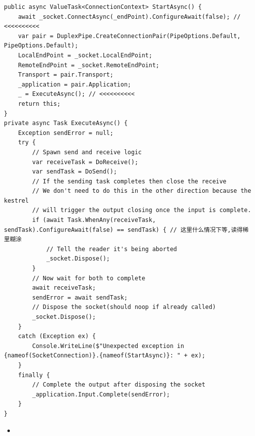 \documentclass[9pt, b5paper]{article}
\begin{document}
\begin{verbatim}
public async ValueTask<ConnectionContext> StartAsync() {
    await _socket.ConnectAsync(_endPoint).ConfigureAwait(false); // <<<<<<<<<<  
    var pair = DuplexPipe.CreateConnectionPair(PipeOptions.Default, PipeOptions.Default);
    LocalEndPoint = _socket.LocalEndPoint;
    RemoteEndPoint = _socket.RemoteEndPoint;
    Transport = pair.Transport;
    _application = pair.Application;
    _ = ExecuteAsync(); // <<<<<<<<<< 
    return this;
}
private async Task ExecuteAsync() {
    Exception sendError = null;
    try {
        // Spawn send and receive logic
        var receiveTask = DoReceive();
        var sendTask = DoSend();
        // If the sending task completes then close the receive
        // We don't need to do this in the other direction because the kestrel
        // will trigger the output closing once the input is complete.
        if (await Task.WhenAny(receiveTask, sendTask).ConfigureAwait(false) == sendTask) { // 这里什么情况下等,读得稀里糊涂
            // Tell the reader it's being aborted
            _socket.Dispose();
        }
        // Now wait for both to complete
        await receiveTask;
        sendError = await sendTask;
        // Dispose the socket(should noop if already called)
        _socket.Dispose();
    }
    catch (Exception ex) {
        Console.WriteLine($"Unexpected exception in {nameof(SocketConnection)}.{nameof(StartAsync)}: " + ex);
    }
    finally {
        // Complete the output after disposing the socket
        _application.Input.Complete(sendError);
    }
}
\end{verbatim}
\begin{itemize}
\item 
\end{itemize}
\end{document}
